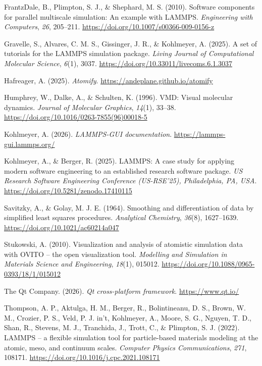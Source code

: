 \documentclass[
]{article}
\newlength{\cslhangindent}
\newenvironment{CSLReferences}[2] %
 {\begin{list}{}{%
  \setlength{\itemindent}{0pt}
  \setlength{\leftmargin}{0pt}
  \setlength{\parsep}{0pt}
  \ifodd #1
   \setlength{\leftmargin}{\cslhangindent}
   \setlength{\itemindent}{-1\cslhangindent}
  \fi
  \setlength{\itemsep}{#2\baselineskip}}}
 {\end{list}}
\begin{document}
\protect{}\label{refs}
\begin{CSLReferences}{1}{0}
FrantzDale, B., Plimpton, S. J., \& Shephard, M. S. (2010). Software
components for parallel multiscale simulation: An example with {LAMMPS}.
\emph{Engineering with Computers}, \emph{26}, 205--211.
\url{https://doi.org/10.1007/s00366-009-0156-z}

Gravelle, S., Alvares, C. M. S., Gissinger, J. R., \& Kohlmeyer, A.
(2025). A set of tutorials for the {LAMMPS} simulation package.
\emph{Living Journal of Computational Molecular Science}, \emph{6}(1),
3037. \url{https://doi.org/10.33011/livecoms.6.1.3037}

Hafreager, A. (2025). \emph{Atomify}.
\url{https://andeplane.github.io/atomify}

Humphrey, W., Dalke, A., \& Schulten, K. (1996). {VMD}: Visual molecular
dynamics. \emph{Journal of Molecular Graphics}, \emph{14}(1), 33--38.
\url{https://doi.org/10.1016/0263-7855(96)00018-5}

Kohlmeyer, A. (2026). \emph{{LAMMPS-GUI} documentation}.
\url{https://lammps-gui.lammps.org/}

Kohlmeyer, A., \& Berger, R. (2025). {LAMMPS}: A case study for applying
modern software engineering to an established research software package.
\emph{US Research Software Engineering Conference (US-RSE'25),
Philadelphia, PA, USA}. \url{https://doi.org/10.5281/zenodo.17410115}

Savitzky, A., \& Golay, M. J. E. (1964). Smoothing and differentiation
of data by simplified least squares procedures. \emph{Analytical
Chemistry}, \emph{36}(8), 1627--1639.
\url{https://doi.org/10.1021/ac60214a047}

Stukowski, A. (2010). Visualization and analysis of atomistic simulation
data with {OVITO} -- the open visualization tool. \emph{Modelling and
Simulation in Materials Science and Engineering}, \emph{18}(1), 015012.
\url{https://doi.org/10.1088/0965-0393/18/1/015012}

The Qt Company. (2026). \emph{Qt cross-platform framework}.
\url{https://www.qt.io/}

Thompson, A. P., Aktulga, H. M., Berger, R., Bolintineanu, D. S., Brown,
W. M., Crozier, P. S., Veld, P. J. in't, Kohlmeyer, A., Moore, S. G.,
Nguyen, T. D., Shan, R., Stevens, M. J., Tranchida, J., Trott, C., \&
Plimpton, S. J. (2022). {LAMMPS} -- a flexible simulation tool for
particle-based materials modeling at the atomic, meso, and continuum
scales. \emph{Computer Physics Communications}, \emph{271}, 108171.
\url{https://doi.org/10.1016/j.cpc.2021.108171}

\end{CSLReferences}
\end{document}
